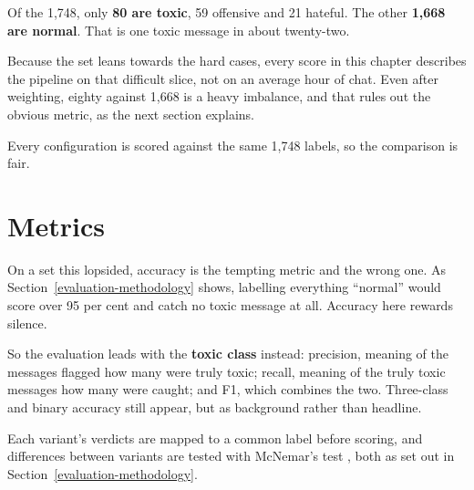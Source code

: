 Of the 1,748, only \textbf{80 are toxic}, 59 offensive and 21 hateful. The other \textbf{1,668 are normal}. That is one toxic message in about twenty-two.

Because the set leans towards the hard cases, every score in this chapter describes the pipeline on that difficult slice, not on an average hour of chat. Even after weighting, eighty against 1,668 is a heavy imbalance, and that rules out the obvious metric, as the next section explains.

Every configuration is scored against the same 1,748 labels, so the comparison is fair.

\section{Metrics}\label{metrics}

On a set this lopsided, accuracy is the tempting metric and the wrong one. As Section~\ref{evaluation-methodology} shows, labelling everything ``normal'' would score over 95 per cent and catch no toxic message at all. Accuracy here rewards silence.

So the evaluation leads with the \textbf{toxic class} instead: precision, meaning of the messages flagged how many were truly toxic; recall, meaning of the truly toxic messages how many were caught; and F1, which combines the two. Three-class and binary accuracy still appear, but as background rather than headline.

Each variant's verdicts are mapped to a common label before scoring, and differences between variants are tested with McNemar's test \citep{mcnemar1947}, both as set out in Section~\ref{evaluation-methodology}.

\renewcommand{\arraystretch}{1.5} 

